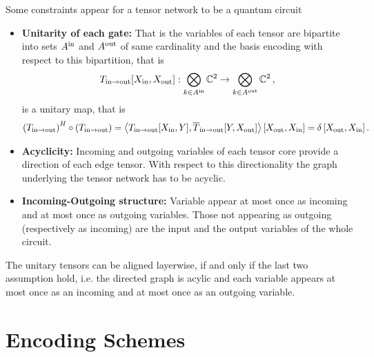\documentclass[aps,onecolumn,nofootinbib,pra]{article}
\begin{document}
    Some constraints appear for a tensor network to be a quantum circuit
    \begin{itemize}
        \item \textbf{Unitarity of each gate:} That is the variables of each tensor are bipartite into sets $A^{\mathrm{in}}$ and $A^{\mathrm{out}}$ of same cardinality and the basis encoding with respect to this bipartition, that is
        \begin{align*}
            T_{\mathrm{in} \rightarrow \mathrm{out}}[X_{\mathrm{in}},X_{\mathrm{out}}] : \bigotimes_{k\in A^{\mathrm{in}}} \mathbb{C}^2 \rightarrow \bigotimes_{k\in A^{\mathrm{out}}} \mathbb{C}^2  \, ,
        \end{align*}
        is a unitary map, that is
        \begin{align*}
            \left(T_{\mathrm{in} \rightarrow \mathrm{out}}\right)^H \circ \left(T_{\mathrm{in} \rightarrow \mathrm{out}}\right)
            = \left\langle 
                T_{\mathrm{in} \rightarrow \mathrm{out}}[X_{\mathrm{in}},Y],
                \overline{T}_{\mathrm{in} \rightarrow \mathrm{out}}[Y,X_{\mathrm{out}}]
            \right\rangle \left[ X_{\mathrm{out}},X_{\mathrm{in}} \right]
            = \delta\left[X_{\mathrm{out}},X_{\mathrm{in}}\right].
        \end{align*}
        \item \textbf{Acyclicity:} Incoming and outgoing variables of each tensor core provide a direction of each edge tensor. With respect to this directionality the graph underlying the tensor network has to be acyclic.
        \item \textbf{Incoming-Outgoing structure:} Variable appear at most once as incoming and at most once as outgoing variables.
        Those not appearing as outgoing (respectively as incoming) are the input and the output variables of the whole circuit.
    \end{itemize}

    The unitary tensors can be aligned layerwise, if and only if the last two assumption hold, i.e. the directed graph is acylic and each variable appears at most once as an incoming and at most once as an outgoing variable.
    
    \section{Encoding Schemes}
\end{document}
